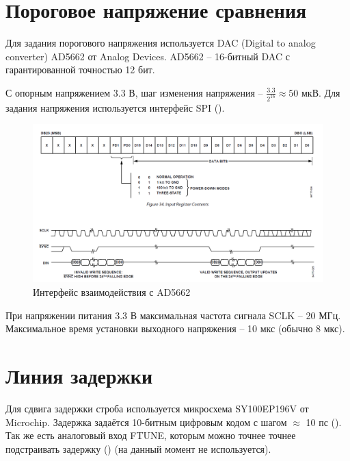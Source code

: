 \section{Пороговое напряжение сравнения}

Для задания порогового напряжения используется DAC (Digital to analog converter) AD5662 от Analog Devices.
AD5662 -- 16-битный DAC с гарантированной точностью 12 бит.


С опорным напряжением 3.3 В, шаг изменения напряжения -- $ \frac{3.3}{2^{16}} \approx 50 $ мкВ.
Для задания напряжения используется интерфейс SPI ().

\begin{figure}[ht!] 
	\center
	\includegraphics [scale=0.5] {my_folder/images//dac_interface}
	\caption{Интерфейс взаимодействия с AD5662} 
	\label{fig:dac-interface}  
\end{figure}

При напряжении питания 3.3 В максимальная частота сигнала SCLK -- 20 МГц. Максимальное время установки
выходного напряжения -- 10 мкс (обычно 8 мкс).

\section{Линия задержки}

Для сдвига задержки строба используется микросхема SY100EP196V от Microchip. Задержка задаётся 10-битным
цифровым кодом с шагом $ \approx $ 10 пс (). Так же есть аналоговый вход FTUNE, которым можно точнее точнее подстраивать
задержку () (на данный момент не используется).

